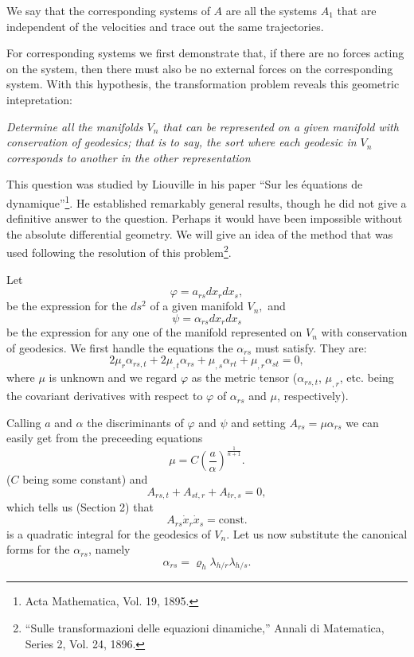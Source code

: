 \documentclass{book}
\begin{document}
We say that the corresponding systems of $A$ are all the systems $A_1$ that are independent of the velocities and trace out the same trajectories. 

For corresponding systems we first demonstrate that, if there are no forces acting on the system, then there must also be no external forces on the corresponding system. With this hypothesis, the transformation problem reveals this geometric intepretation:

\emph{Determine all the manifolds $V_n$ that can be represented on a given manifold with conservation of geodesics; that is to say, the sort where each geodesic in $V_n$ corresponds to another in the other representation}

This question was studied by Liouville in his paper ``Sur les \'equations de dynamique''\footnote{Acta Mathematica, Vol. 19, 1895.}. He established remarkably general results, though he did not give a definitive answer to the question. Perhaps it would have been impossible without the absolute differential geometry. We will give an idea of the method that was used following the resolution of this problem\footnote{``Sulle transformazioni delle equazioni dinamiche,'' Annali di Matematica, Series 2, Vol. 24, 1896.}.

Let
$$\varphi=a_{rs}dx_rdx_s,$$
be the expression for the $ds^2$ of a given manifold $V_n,$ and
$$\psi=\alpha_{rs}dx_rdx_s$$
be the expression for any one of the manifold represented on $V_n$ with conservation of geodesics. We first handle the equations the $\alpha_{rs}$ must satisfy. They are:
$$2\mu_r\alpha_{rs,t}+2\mu_{,t}\alpha_{rs}+\mu_{,s}\alpha_{rt}+\mu_{,r}\alpha_{st}=0,$$
where $\mu$ is unknown and we regard $\varphi$ as the metric tensor ($\alpha_{rs,t}$, $\mu_{,r}$, etc. being the covariant derivatives with respect to $\varphi$ of $\alpha_{rs}$ and $\mu$, respectively). 

Calling $a$ and $\alpha$ the discriminants of $\varphi$ and $\psi$ and setting
$A_{rs}=\mu\alpha_{rs}$
we can easily get from the preceeding equations
$$\mu=C\left(\frac{a}{\alpha}\right)^{\frac{1}{n+1}}.$$
($C$ being some constant) and
$$A_{rs,t}+A_{st,r}+A_{tr,s}=0,$$ 
which tells us (Section 2) that
$$A_{rs}\dot{x}_r\dot{x}_s=\text{const.}$$
is a quadratic integral for the geodesics of $V_n$. Let us now substitute the canonical forms for the $\alpha_{rs}$, namely
$$\alpha_{rs}=\varrho_{h}\lambda_{h/r}\lambda_{h/s}.$$
\end{document}
